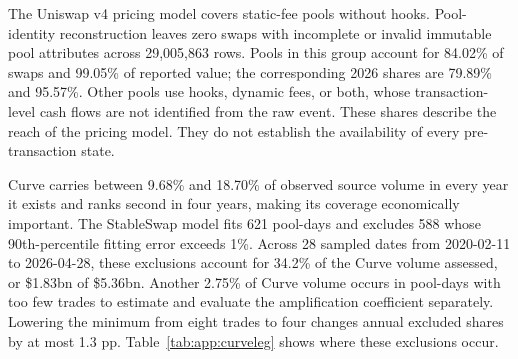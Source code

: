 \begin{table}[t]
\centering
\caption{Exchange-source composition and Ethereum market coverage}
\label{tab:app:venues}
\scriptsize

\end{table}

The Uniswap v4 pricing model covers static-fee pools without hooks. Pool-identity reconstruction leaves zero swaps with incomplete or invalid immutable pool attributes across 29,005,863 rows. Pools in this group account for 84.02\% of swaps and 99.05\% of reported value; the corresponding 2026 shares are 79.89\% and 95.57\%. Other pools use hooks, dynamic fees, or both, whose transaction-level cash flows are not identified from the raw event. These shares describe the reach of the pricing model. They do not establish the availability of every pre-transaction state.

Curve carries between 9.68\% and 18.70\% of observed source volume in every year it exists and ranks second in four years, making its coverage economically important. The StableSwap model fits 621 pool-days and excludes 588 whose 90th-percentile fitting error exceeds 1\%. Across 28 sampled dates from 2020-02-11 to 2026-04-28, these exclusions account for 34.2\% of the Curve volume assessed, or \$1.83bn of \$5.36bn. Another 2.75\% of Curve volume occurs in pool-days with too few trades to estimate and evaluate the amplification coefficient separately. Lowering the minimum from eight trades to four changes annual excluded shares by at most 1.3 pp. Table~\ref{tab:app:curveleg} shows where these exclusions occur.

